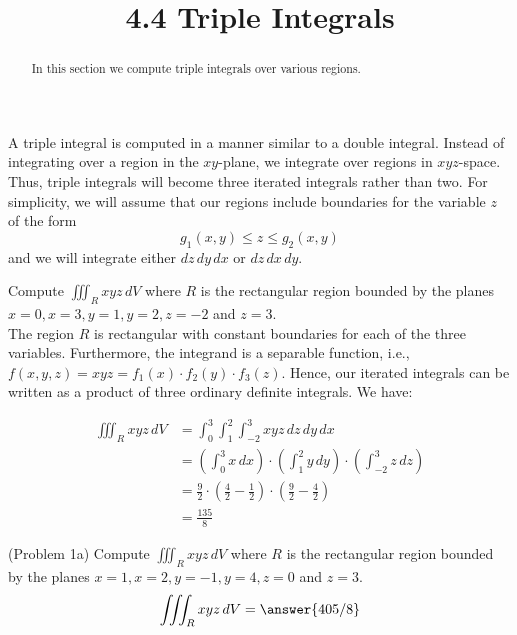 \documentclass[handout]{ximera}
\title{4.4 Triple Integrals}
\begin{document}
\begin{abstract}
In this section we compute triple integrals over various regions.
\end{abstract}
 
\maketitle

A triple integral is computed in a manner similar to a double integral.  Instead of integrating over a region in the $xy$-plane,
we integrate over regions in $xyz$-space.  Thus, triple integrals will become three iterated integrals rather than two.
For simplicity, we will assume that our regions include boundaries for the variable $z$ of the form 
\[
g_1(x,y) \leq z \leq g_2(x,y)
\]
and we will integrate either $dz\, dy\, dx$ or $dz\, dx\, dy$.


\begin{example}[Example 1]
Compute $\iiint_R xyz \, dV$ where $R$ is the rectangular region bounded by the 
planes $x = 0, x = 3, y = 1, y = 2, z = -2$ and $z = 3$.\\
The region $R$ is rectangular with constant boundaries for each of the three variables.  Furthermore, the integrand
is a separable function, i.e., $f(x,y,z) = xyz = f_1(x) \cdot f_2(y) \cdot f_3(z)$. Hence, our iterated integrals can 
be written as a product of three ordinary definite integrals. We have:

\begin{align*}
\iiint_R xyz \, dV & = \int_0^3\int_1^2 \int_{-2}^3 xyz \,dz\, dy \, dx\\
                 & =\left(\int_0^3 x \, dx \right) \cdot \left(\int_1^2 y\, dy\right) \cdot \left(\int_{-2}^3z \,dz \right)\\
                 & = \frac92 \cdot \left(\frac{4}{2} -\frac12\right) \cdot \left(\frac92 - \frac42\right)\\
                 &=  \frac{135}{8}
\end{align*}      

\end{example}


\begin{problem}(Problem 1a)
Compute $\iiint_R xyz \, dV$ where $R$ is the rectangular region bounded by the 
planes $x = 1, x = 2, y = -1, y = 4, z = 0$ and $z = 3$.\\
\[
\iiint_R xyz \, dV = \answer{405/8}
\]
\end{problem}
\end{document}
